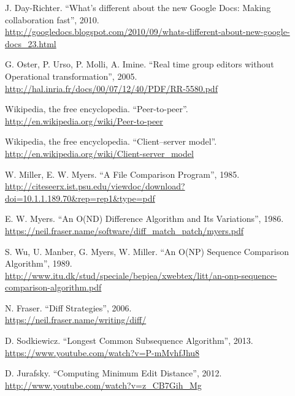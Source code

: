 \documentclass[a4paper, 12pt, twoside]{book}
\begin{document}
\begin{thebibliography}{99}
 J. Day-Richter. “What’s different about the new Google Docs: Making collaboration fast”, 2010.
\\\url{http://googledocs.blogspot.com/2010/09/whats-different-about-new-google-docs_23.html}

 G. Oster, P. Urso, P. Molli, A. Imine. “Real time group editors without Operational transformation”, 2005.
\\\url{http://hal.inria.fr/docs/00/07/12/40/PDF/RR-5580.pdf}

 Wikipedia, the free encyclopedia. “Peer-to-peer”.
\\\url{http://en.wikipedia.org/wiki/Peer-to-peer}

 Wikipedia, the free encyclopedia. “Client–server model”.
\\\url{http://en.wikipedia.org/wiki/Client-server_model}

 W. Miller, E. W. Myers. “A File Comparison Program”, 1985.
\\\url{http://citeseerx.ist.psu.edu/viewdoc/download?doi=10.1.1.189.70&rep=rep1&type=pdf}

 E. W. Myers. “An O(ND) Difference Algorithm and Its Variations”, 1986.
\\\url{https://neil.fraser.name/software/diff_match_patch/myers.pdf}

 S. Wu, U. Manber, G. Myers, W. Miller. “An O(NP) Sequence Comparison Algorithm”, 1989.
\\\url{http://www.itu.dk/stud/speciale/bepjea/xwebtex/litt/an-onp-sequence-comparison-algorithm.pdf}

 N. Fraser. “Diff Strategies”, 2006.
\\\url{https://neil.fraser.name/writing/diff/}

 D. Sodkiewicz. “Longest Common Subsequence Algorithm”, 2013.
\\\url{https://www.youtube.com/watch?v=P-mMvhfJhu8}

 D. Jurafsky. “Computing Minimum Edit Distance”, 2012.
\\\url{http://www.youtube.com/watch?v=z_CB7Gih_Mg}

\end{thebibliography}

\end{document}
